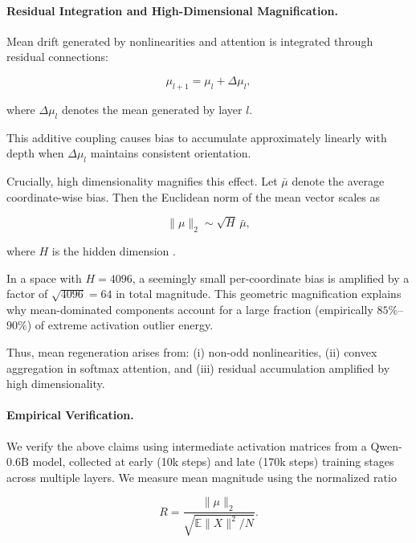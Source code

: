 \paragraph{Residual Integration and High-Dimensional Magnification.}

Mean drift generated by nonlinearities and attention
is integrated through residual connections:

\begin{equation}
\mu_{l+1}
=
\mu_l + \Delta\mu_l,
\label{eq:residual_accumulation}
\end{equation}

where $\Delta\mu_l$ denotes the mean generated by layer $l$.

This additive coupling causes bias to accumulate approximately linearly
with depth when $\Delta\mu_l$ maintains consistent orientation.

Crucially, high dimensionality magnifies this effect.
Let $\bar{\mu}$ denote the average coordinate-wise bias.
Then the Euclidean norm of the mean vector scales as

\begin{equation}
\|\mu\|_2
\sim
\sqrt{H}\,\bar{\mu},
\label{eq:mean_scaling}
\end{equation}

where $H$ is the hidden dimension
\cite{tropp2012user,halko2011randomized}.

In a space with $H=4096$,
a seemingly small per-coordinate bias is amplified
by a factor of $\sqrt{4096}=64$ in total magnitude.
This geometric magnification explains why mean-dominated components
account for a large fraction (empirically $85\%$–$90\%$)
of extreme activation outlier energy.

Thus, mean regeneration arises from:
(i) non-odd nonlinearities,
(ii) convex aggregation in softmax attention,
and (iii) residual accumulation amplified by high dimensionality.


\paragraph{Empirical Verification.}

We verify the above claims using intermediate activation matrices
from a Qwen-0.6B model, collected at early (10k steps) and late (170k steps)
training stages across multiple layers.
We measure mean magnitude using the normalized ratio

\begin{equation}
R = \frac{\|\mu\|_2}{\sqrt{\mathbb{E}\|X\|^2/N}}.
\end{equation}

